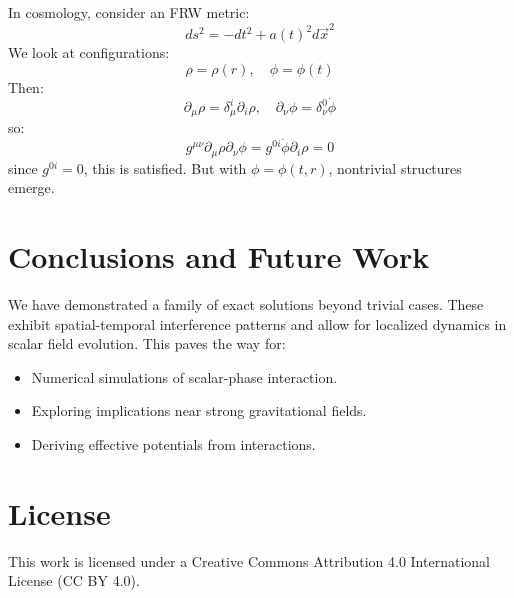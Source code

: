 \documentclass{article}
\begin{document}
In cosmology, consider an FRW metric:
\[
ds^2 = -dt^2 + a(t)^2 d\vec{x}^2
\]
We look at configurations:
\[
\rho = \rho(r), \quad \phi = \phi(t)
\]
Then:
\[
\partial_\mu \rho = \delta^i_\mu \partial_i \rho, \quad
\partial_\nu \phi = \delta^0_\nu \dot{\phi}
\]
so:
\[
g^{\mu\nu} \partial_\mu \rho \partial_\nu \phi = g^{0i} \dot{\phi} \partial_i \rho = 0
\]
since \(g^{0i} = 0\), this is satisfied. But with \(\phi = \phi(t, r)\), nontrivial structures emerge.

\section{Conclusions and Future Work}

We have demonstrated a family of exact solutions beyond trivial cases. These exhibit spatial-temporal interference patterns and allow for localized dynamics in scalar field evolution. This paves the way for:

\begin{itemize}
\item Numerical simulations of scalar-phase interaction.
\item Exploring implications near strong gravitational fields.
\item Deriving effective potentials from interactions.
\end{itemize}


\section*{License}
This work is licensed under a Creative Commons Attribution 4.0 International License (CC BY 4.0).
\end{document}
